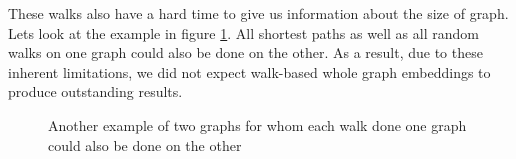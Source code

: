 These walks also have a hard time to give us information about the size of graph. Lets look at the example in figure \ref{figure:random_walk_cant_differentiate_regular}. All shortest paths as well as all random walks on one graph could also be done on the other. As a result, due to these inherent limitations, we did not expect walk-based whole graph embeddings to produce outstanding results.

\begin{figure}[ht!]
    \begin{minipage}{\linewidth}
        \begin{minipage}{.5\linewidth}
            \centering
        \end{minipage}%
        \begin{minipage}{.5\linewidth}
            \centering

        \end{minipage}%
    \end{minipage}
    \caption[short]{Another example of two graphs for whom each walk done one graph could also be done on the other}
    \label{figure:random_walk_cant_differentiate_regular}
\end{figure}



